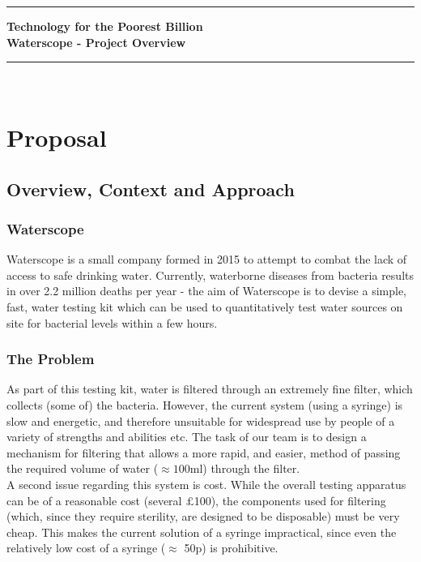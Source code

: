 \documentclass[12pt]{article}
\begin{document}
\noindent
\rule{15.7cm}{0.5mm}


\begin{center}
{\bf Technology for the Poorest Billion}\\
\vspace{0.5cm} {\bf Waterscope - Project Overview}\\
\end{center}
\rule{15.7cm}{0.5mm}

\hfill\\
\section{Proposal}
\subsection{Overview, Context and Approach}
\subsubsection{Waterscope}
Waterscope is a small company formed in 2015 to attempt to combat the lack of access to safe drinking water. Currently, waterborne diseases from bacteria results in over 2.2 million deaths per year - the aim of Waterscope is to devise a simple, fast, water testing kit which can be used to quantitatively test water sources on site for bacterial levels within a few hours.
\subsubsection{The Problem}
As part of this testing kit, water is filtered through an extremely fine filter, which collects (some of) the bacteria. However, the current system (using a syringe) is slow and energetic, and therefore unsuitable for widespread use by people of a variety of strengths and abilities etc. The task of our team is to design a mechanism for filtering that allows a more rapid, and easier, method of passing the required volume of water ($\approx 100$ml) through the filter.\\
A second issue regarding this system is cost. While the overall testing apparatus can be of a reasonable cost (several $\pounds$100), the components used for filtering (which, since they require sterility, are designed to be disposable) must be very cheap. This makes the current solution of a syringe impractical, since even the relatively low cost of a syringe ($\approx$ 50p) is prohibitive.
\end{document}

